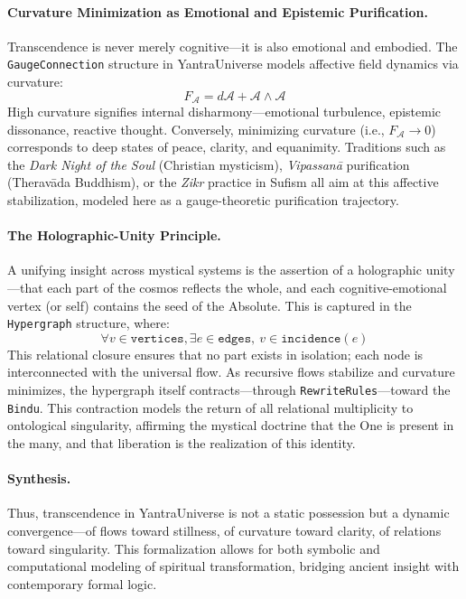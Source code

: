\documentclass[12pt]{article}
\theoremstyle{plain}
\begin{document}
\paragraph{Curvature Minimization as Emotional and Epistemic Purification.}
Transcendence is never merely cognitive—it is also emotional and embodied. The \texttt{GaugeConnection} structure in YantraUniverse models affective field dynamics via curvature:
\[
F_{\mathcal{A}} = d\mathcal{A} + \mathcal{A} \wedge \mathcal{A}
\]
High curvature signifies internal disharmony—emotional turbulence, epistemic dissonance, reactive thought. Conversely, minimizing curvature (i.e., $F_{\mathcal{A}} \to 0$) corresponds to deep states of peace, clarity, and equanimity. Traditions such as the \textit{Dark Night of the Soul} (Christian mysticism), \textit{Vipassanā} purification (Theravāda Buddhism), or the \textit{Zikr} practice in Sufism all aim at this affective stabilization, modeled here as a gauge-theoretic purification trajectory.

\paragraph{The Holographic-Unity Principle.}
A unifying insight across mystical systems is the assertion of a holographic unity—that each part of the cosmos reflects the whole, and each cognitive-emotional vertex (or self) contains the seed of the Absolute. This is captured in the \texttt{Hypergraph} structure, where:
\[
\forall v \in \texttt{vertices}, \exists e \in \texttt{edges},\ v \in \texttt{incidence}(e)
\]
This relational closure ensures that no part exists in isolation; each node is interconnected with the universal flow. As recursive flows stabilize and curvature minimizes, the hypergraph itself contracts—through \texttt{RewriteRules}—toward the \texttt{Bindu}. This contraction models the return of all relational multiplicity to ontological singularity, affirming the mystical doctrine that the One is present in the many, and that liberation is the realization of this identity.

\paragraph{Synthesis.}
Thus, transcendence in YantraUniverse is not a static possession but a dynamic convergence—of flows toward stillness, of curvature toward clarity, of relations toward singularity. This formalization allows for both symbolic and computational modeling of spiritual transformation, bridging ancient insight with contemporary formal logic.
\end{document}
